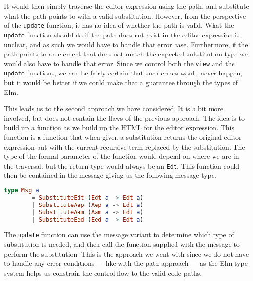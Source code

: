 It would then simply traverse the editor expression using the path, and
substitute what the path points to with a valid substitution. However, from the
perspective of the \texttt{update} function, it has no idea of whether the path
is valid. What the \texttt{update} function should do if the path does not exist
in the editor expression is unclear, and as such we would have to handle that
error case. Furthermore, if the path points to an element that does not match
the expected substitution type we would also have to handle that error. Since we
control both the \texttt{view} and the \texttt{update} functions, we can be
fairly certain that such errors would never happen, but it would be better if we
could make that a guarantee through the types of Elm.

This leads us to the second approach we have considered. It is a bit more
involved, but does not contain the flaws of the previous approach. The idea is
to build up a function as we build up the HTML for the editor expression. This
function is a function that when given a substitution returns the original
editor expression but with the current recursive term replaced by the
substitution. The type of the formal parameter of the function would depend on
where we are in the traversal, but the return type would always be an
\texttt{Edt}. This function could then be contained in the message giving us the following
message type.

\begin{lstlisting}[language=elm,%
                   gobble=4,%
                   ]
    type Msg a
        = SubstituteEdt (Edt a -> Edt a)
        | SubstituteAep (Aep a -> Edt a)
        | SubstituteAam (Aam a -> Edt a)
        | SubstituteEed (Eed a -> Edt a)
\end{lstlisting}

The \texttt{update} function can use the message variant to determine which type
of substitution is needed, and then call the function supplied with the message
to perform the substitution. This is the approach we went with since we do not
have to handle any error conditions --- like with the path approach --- as the
Elm type system helps us constrain the control flow to the valid code paths.

